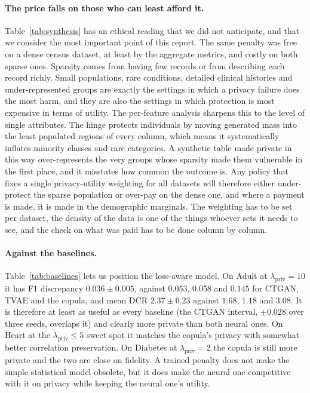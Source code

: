 \documentclass[11pt,a4paper]{article}
\newcommand{\lpriv}{\lambda_{\text{priv}}}
\begin{document}
\paragraph{The price falls on those who can least afford it.}
Table~\ref{tab:synthesis} has an ethical reading that we did not anticipate,
and that we consider the most important point of this report. The same
penalty was free on a dense census dataset, at least by the aggregate metrics,
and costly on both sparse ones. Sparsity comes from having few records or from
describing each record richly. Small populations, rare conditions, detailed
clinical histories and under-represented groups are exactly the settings in
which a privacy failure does the most harm, and they are also the settings in
which protection is most expensive in terms of utility. The per-feature
analysis sharpens this to the level of single attributes. The hinge protects
individuals by moving generated mass into the least populated regions of every
column, which means it systematically inflates minority classes and rare
categories. A synthetic table made private in this way over-represents the
very groups whose sparsity made them vulnerable in the first place, and it
misstates how common the outcome is. Any policy that fixes a single
privacy-utility weighting for all datasets will therefore either under-protect
the sparse population or over-pay on the dense one, and where a payment is
made, it is made in the demographic marginals. The weighting has to be set per
dataset, the density of the data is one of the things whoever sets it needs to
see, and the check on what was paid has to be done column by column.

\paragraph{Against the baselines.}
Table~\ref{tab:baselines} lets us position the loss-aware model. On Adult at
$\lpriv = 10$ it has F1 discrepancy $0.036 \pm 0.005$, against $0.053$,
$0.058$ and $0.145$ for CTGAN, TVAE and the copula, and mean DCR
$2.37 \pm 0.23$ against $1.68$, $1.18$ and $3.08$. It is therefore at least as
useful as every baseline (the CTGAN interval, $\pm 0.028$ over three seeds,
overlaps it) and clearly more private than both neural ones. On Heart at the
$\lpriv \le 5$ sweet spot it matches the copula's privacy with somewhat better
correlation preservation. On Diabetes at $\lpriv = 2$ the copula is still
more private and the two are close on fidelity. A trained penalty does not
make the simple statistical model obsolete, but it does make the neural one
competitive with it on privacy while keeping the neural one's utility.
\end{document}
